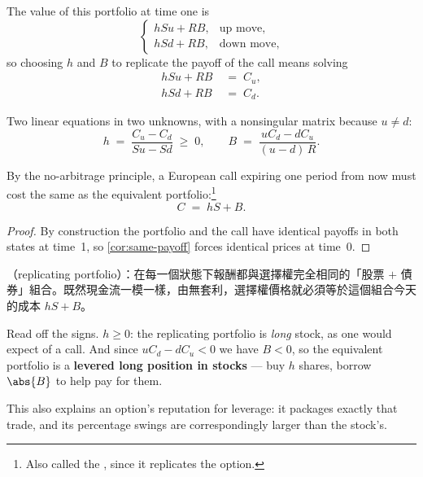 The value of this portfolio at time one is
\[
	\begin{cases}
		hSu+RB, & \text{up move},  \\
		hSd+RB, & \text{down move},
	\end{cases}
\]
so choosing $h$ and $B$ to replicate the payoff of the call means solving
\begin{equation}
	\begin{aligned}
		hSu+RB & \;=\; C_{u} , \\
		hSd+RB & \;=\; C_{d} .
	\end{aligned}
	\label{eq:bopm-replicate}
\end{equation}

\suppstart
Two linear equations in two unknowns, with a nonsingular matrix because $u\ne d$:
\suppend
\begin{equation}
	h \;=\; \frac{C_{u}-C_{d}}{Su-Sd} \;\ge\; 0 ,
	\qquad
	B \;=\; \frac{uC_{d}-dC_{u}}{(u-d)\,R} .
	\label{eq:bopm-hb}
\end{equation}

\begin{theorem}
	\label{thm:bopm-call}
	By the no-arbitrage principle, a European call expiring one period from now must cost the same as the equivalent portfolio:\footnote{Also called the , since it replicates the option.}
	\begin{equation}
		C \;=\; hS+B .
		\label{eq:bopm-price}
	\end{equation}
\end{theorem}

\suppstart
\begin{proof}
	By construction the portfolio and the call have identical payoffs in both states at time~1, so \autoref{cor:same-payoff} forces identical prices at time~0.
\end{proof}

\begin{remark}
	（replicating portfolio）：在每一個狀態下報酬都與選擇權完全相同的「股票 $+$ 債券」組合。既然現金流一模一樣，由無套利，選擇權價格就必須等於這個組合今天的成本 $hS+B$。
\end{remark}
\suppend

\begin{note}
	Read off the signs. $h\ge 0$: the replicating portfolio is \emph{long} stock, as one would expect of a call. And since $uC_{d}-dC_{u}<0$ we have $B<0$, so the equivalent portfolio is a \textbf{levered long position in stocks} --- buy $h$ shares, borrow $\abs{B}$ to help pay for them.

	\suppstart
	This also explains an option's reputation for leverage: it packages exactly that trade, and its percentage swings are correspondingly larger than the stock's.
\end{note}

